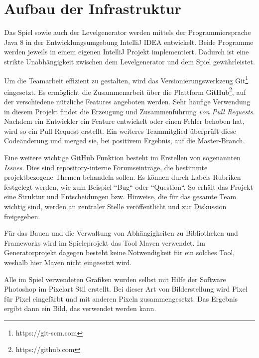 \section{Aufbau der Infrastruktur}

Das Spiel sowie auch der Levelgenerator werden mittels der Programmiersprache Java 8 in der Entwicklungsumgebung IntelliJ IDEA entwickelt. Beide Programme werden jeweils in einem eigenen IntelliJ Projekt implementiert.
Dadurch ist eine strikte Unabhängigkeit zwischen dem Levelgenerator und dem Spiel gewährleistet.

Um die Teamarbeit effizient zu gestalten, wird das Versionierungswerkzeug Git\footnote{https://git-scm.com} eingesetzt.
Es ermöglicht die Zusammenarbeit über die Plattform GitHub\footnote{https://github.com}, auf der verschiedene nützliche Features angeboten werden.
Sehr häufige Verwendung in diesem Projekt findet die Erzeugung und Zusammenführung \textit{von Pull Requests}.
Nachdem ein Entwickler ein Feature entwickelt oder einen Fehler behoben hat, wird so ein Pull Request erstellt.
Ein weiteres Teammitglied überprüft diese Codeänderung und merged sie, bei positivem Ergebnis, auf die Master-Branch.

Eine weitere wichtige GitHub Funktion besteht im Erstellen von sogenannten \textit{Issues}.
Dies sind repository-interne Forumseinträge, die bestimmte projektbezogene Themen behandeln sollen.
Es können durch Labels Rubriken festgelegt werden, wie zum Beispiel ``Bug`` oder ``Question``.
So erhält das Projekt eine Struktur und Entscheidungen bzw. Hinweise, die für das gesamte Team wichtig sind, werden an zentraler Stelle veröffentlicht und zur Diskussion freigegeben.

Für das Bauen und die Verwaltung von Abhängigkeiten zu Bibliotheken und Frameworks wird im Spieleprojekt das Tool Maven verwendet.
Im Generatorprojekt dagegen besteht keine Notwendigkeit für ein solches Tool, weshalb hier Maven nicht eingesetzt wird.

Alle im Spiel verwendeten Grafiken wurden selbst mit Hilfe der Software Photoshop im Pixelart Stil erstellt. Bei dieser Art von Bilderstellung wird Pixel für Pixel eingefärbt und mit anderen Pixeln zusammengesetzt. Das Ergebnis ergibt dann ein Bild, das verwendet werden kann.